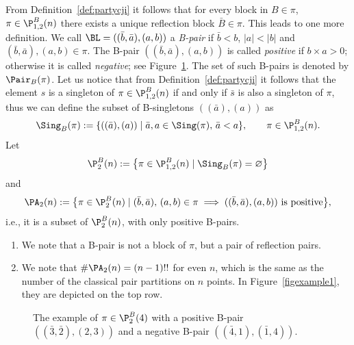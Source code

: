 From Definition~\ref{def:partycji} it follows that for every block in $B\in \pi$, $\pi \in \P_{1,2}^{B}(n)$ there exists a unique {reflection block} $\bar B\in\pi$.
This leads to one more definition.
We call $\BL= ((\bar b, \bar a),( a,b))$ a \emph{B-pair} if $\bar b <b$, $|{a}| <|b|$ and $(\bar b,\bar a ), (a,b)\in \pi$.
The B-pair $((\bar b, \bar a),( a,b))$ is called \emph{positive} if $b\times a >0 $; otherwise
it is called \emph{negative}; see Figure~\ref{fig:coneced}.
The set of such B-pairs is denoted by $\Pair_B(\pi)$.
Let us notice that from Definition~\ref{def:partycji} it follows that
the element $s$ is a singleton of $\pi \in \P_{1,2}^{B}(n)$ if and only if $\bar s$ is also a singleton of $\pi$, thus we can define the subset of B-singletons $((\bar a),(a))$ as
\[
\Sing_B(\pi):=\{((\bar a), (a)) \mid \bar a,a \in \Sing(\pi), \,\bar a < a\}, \qquad \pi \in \P_{1,2}^{B}(n).
\]
Let
\[
\P_{2}^{B}(n):=\big\{\pi \in \P_{1,2}^{B}(n)\mid \Sing_B(\pi)=\varnothing\big\}
\]
and
\[
\PA_2(n):=\big\{\pi \in \P_{2}^{B}(n)\mid (\bar b,\bar a ),\, (a,b)\in \pi \implies ((\bar b,\bar a ), (a,b))\text{ is positive}\big\},
\]
i.e., it is a subset of $\P_{2}^{B}(n)$, with only positive B-pairs.

\begin{Remark}\quad
\begin{enumerate}
\item [$1.$] We note that a B-pair is not a block of $\pi$, but a pair of reflection pairs.
	
\item [$2.$] We note that $\#\PA_2(n)=(n-1)!!$ for even $n$, which is the same as the number of the classical pair partitions on $n$ points.
	In Figure~\ref{figexample1}, they are depicted on the top row.
\end{enumerate}	
\end{Remark}

\begin{figure}[h]\centering
{}
\caption{The example of $\pi \in \P_{2}^{B}(4)$ with a positive B-pair $((\bar 3,\bar 2 ), (2,3))$ and a negative B-pair $((\bar 4,1), (\bar 1,4))$. }
	\label{fig:coneced}
\end{figure}

